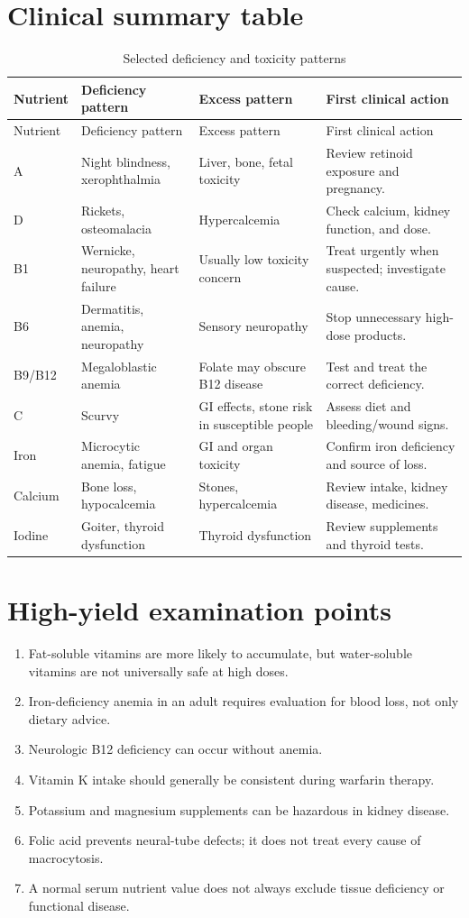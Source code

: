 \section{Clinical summary table}
\begin{longtable}{p{}p{}p{}p{}}
\caption{Selected deficiency and toxicity patterns}\\
\toprule
Nutrient & Deficiency pattern & Excess pattern & First clinical action \\
\midrule
\endfirsthead
\toprule Nutrient & Deficiency pattern & Excess pattern & First clinical action \\
\midrule
\endhead
A & Night blindness, xerophthalmia & Liver, bone, fetal toxicity & Review retinoid exposure and pregnancy.\\
D & Rickets, osteomalacia & Hypercalcemia & Check calcium, kidney function, and dose.\\
B1 & Wernicke, neuropathy, heart failure & Usually low toxicity concern & Treat urgently when suspected; investigate cause.\\
B6 & Dermatitis, anemia, neuropathy & Sensory neuropathy & Stop unnecessary high-dose products.\\
B9/B12 & Megaloblastic anemia & Folate may obscure B12 disease & Test and treat the correct deficiency.\\
C & Scurvy & GI effects, stone risk in susceptible people & Assess diet and bleeding/wound signs.\\
Iron & Microcytic anemia, fatigue & GI and organ toxicity & Confirm iron deficiency and source of loss.\\
Calcium & Bone loss, hypocalcemia & Stones, hypercalcemia & Review intake, kidney disease, medicines.\\
Iodine & Goiter, thyroid dysfunction & Thyroid dysfunction & Review supplements and thyroid tests.\\
\bottomrule
\end{longtable}

\section{High-yield examination points}
\begin{enumerate}
\item Fat-soluble vitamins are more likely to accumulate, but water-soluble vitamins are not universally safe at high doses.
\item Iron-deficiency anemia in an adult requires evaluation for blood loss, not only dietary advice.
\item Neurologic B12 deficiency can occur without anemia.
\item Vitamin K intake should generally be consistent during warfarin therapy.
\item Potassium and magnesium supplements can be hazardous in kidney disease.
\item Folic acid prevents neural-tube defects; it does not treat every cause of macrocytosis.
\item A normal serum nutrient value does not always exclude tissue deficiency or functional disease.
\end{enumerate}

